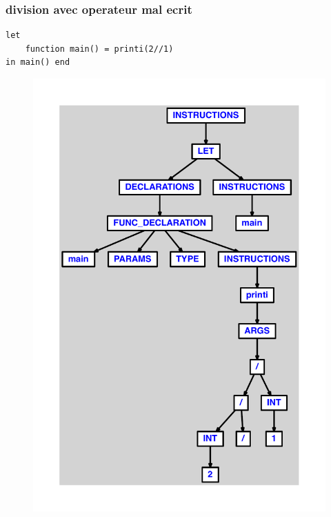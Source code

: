 \documentclass{article}
\begin{document}
\subsubsection{division avec operateur mal ecrit}
\begin{lstlisting}
let
	function main() = printi(2//1)
in main() end
\end{lstlisting}
\newpage
\begin{figure}[H]
\centering
\includegraphics[max width=\textwidth]{ast/ast_25.pdf}
\end{figure}
\newpage
\end{document}
